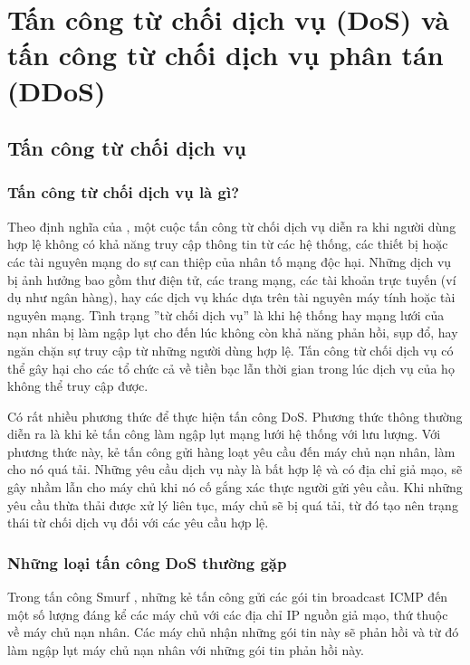 \section{Tấn công từ chối dịch vụ (DoS) và tấn công từ chối dịch vụ phân tán (DDoS)}

\subsection{Tấn công từ chối dịch vụ}

\subsubsection{Tấn công từ chối dịch vụ là gì?}

Theo định nghĩa của \cite{1-dos-concept}, một cuộc tấn công từ chối dịch vụ diễn ra khi người dùng hợp lệ không có khả năng truy cập thông tin từ các hệ thống, các thiết bị hoặc các tài nguyên mạng do sự can thiệp của nhân tố mạng độc hại. Những dịch vụ bị ảnh hưởng bao gồm thư điện tử, các trang mạng, các tài khoản trực tuyến (ví dụ như ngân hàng), hay các dịch vụ khác dựa trên tài nguyên máy tính hoặc tài nguyên mạng. Tình trạng ''từ chối dịch vụ''  là khi hệ thống hay mạng lưới của nạn nhân bị làm ngập lụt cho đến lúc không còn khả năng phản hồi, sụp đổ, hay ngăn chặn sự truy cập từ những người dùng hợp lệ. Tấn công từ chối dịch vụ có thể gây hại cho các tổ chức cả về tiền bạc lẫn thời gian trong lúc dịch vụ của họ không thể truy cập được.

Có rất nhiều phương thức để thực hiện tấn công DoS. Phương thức thông thường diễn ra là khi kẻ tấn công làm ngập lụt mạng lưới hệ thống với lưu lượng. Với phương thức này, kẻ tấn công gửi hàng loạt yêu cầu đến máy chủ nạn nhân, làm cho nó quá tải. Những yêu cầu dịch vụ này là bất hợp lệ và có địa chỉ giả mạo, sẽ gây nhầm lẫn cho máy chủ khi nó cố gắng xác thực người gửi yêu cầu. Khi những yêu cầu thừa thải được xử lý liên tục, máy chủ sẽ bị quá tải, từ đó tạo nên trạng thái từ chối dịch vụ đối với các yêu cầu hợp lệ.

\subsubsection{Những loại tấn công DoS thường gặp}

Trong tấn công Smurf \cite{1-dos-concept}, những kẻ tấn công gửi các gói tin broadcast ICMP đến một số lượng đáng kể các máy chủ với các địa chỉ IP nguồn giả mạo, thứ thuộc về máy chủ nạn nhân. Các máy chủ nhận những gói tin này sẽ phản hồi và từ đó làm ngập lụt máy chủ nạn nhân với những gói tin phản hồi này.

